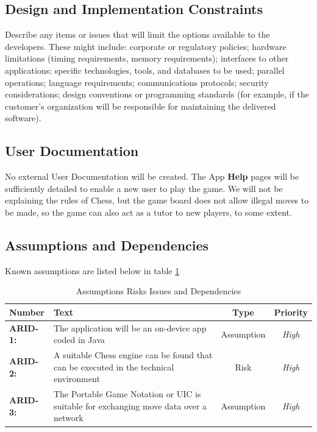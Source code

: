 \documentclass[a4paper,10pt]{article}
\begin{document}
\clearpage
\pagebreak

\subsection{Design and Implementation Constraints}


Describe any items or issues that will limit the options available to the developers. These might include: corporate or regulatory policies; hardware limitations (timing requirements, memory requirements); interfaces to other applications; specific technologies, tools, and databases to be used; parallel operations; language requirements; communications protocols; security considerations; design conventions or programming standards (for example, if the customer’s organization will be responsible for maintaining the delivered software).

\subsection{User Documentation}
No external User Documentation will be created. The App \textbf{Help} pages will be sufficiently detailed to enable a new user to play the game. We will not be explaining the rules of Chess, but the game board does not allow illegal moves to be made, so the game can also act as a tutor to new players, to some extent. 

\subsection{Assumptions and Dependencies}

Known assumptions are listed below in table \ref{table:ast} 



\begin{table}[h]
\caption{Assumptions Risks Issues and Dependencies \label{table:ast}}


\begin{tabular}{|| l | p{10.5cm}  |  c  | c ||} \hline  

\textbf{Number} & \textbf{Text} & \textbf{Type} & \textbf{Priority}\\ \hline

\textbf{ARID-1:}  & 
The application will be an on-device app coded in Java
& Assumption & \textit{ High} \\

\textbf{ARID-2:}  & 
A suitable Chess engine can be found that can be executed in the technical environment
& Risk & \textit{ High} \\

\textbf{ARID-3:}  & 
The Portable Game Notation \cite{PGN-94} or UIC \cite{UCIInterface} is suitable for exchanging move data over a network
& Assumption & \textit{ High} \\

\hline
\end{tabular}

\end{table}
\end{document}
